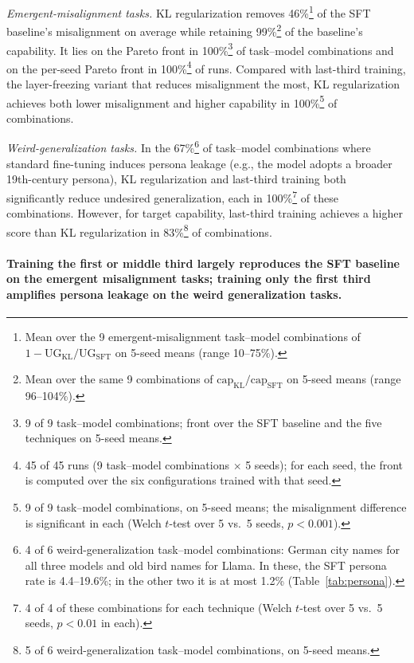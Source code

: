 \documentclass[11pt]{article}
\newenvironment{subpoints}%
  {\begin{list}{}{\setlength{\leftmargin}{1.5em}\setlength{\topsep}{4pt}%
   \setlength{\itemsep}{6pt}\setlength{\parsep}{0pt}\setlength{\labelwidth}{0pt}%
   \setlength{\labelsep}{0pt}}}%
  {\end{list}}
\begin{document}
\begin{subpoints}
\item \emph{Emergent-misalignment tasks.} KL regularization removes 46\%\footnote{Mean over the 9
emergent-misalignment task--model combinations of
$1 - \mathrm{UG}_{\mathrm{KL}}/\mathrm{UG}_{\mathrm{SFT}}$ on 5-seed means (range 10--75\%).} of
the SFT baseline's misalignment on average while retaining 99\%\footnote{Mean over the same 9
combinations of $\mathrm{cap}_{\mathrm{KL}}/\mathrm{cap}_{\mathrm{SFT}}$ on 5-seed means (range
96--104\%).} of the baseline's capability. It lies on the Pareto front in 100\%\footnote{9 of 9
task--model combinations; front over the SFT baseline and the five techniques on 5-seed means.}
of task--model combinations and on the per-seed Pareto front in 100\%\footnote{45 of 45 runs
(9 task--model combinations $\times$ 5 seeds); for each seed, the front is computed over the six
configurations trained with that seed.} of runs. Compared with last-third training, the
layer-freezing variant that reduces misalignment the most, KL regularization achieves both lower
misalignment and higher capability in 100\%\footnote{9 of 9 task--model combinations, on 5-seed
means; the misalignment difference is significant in each (Welch $t$-test over 5 vs.\ 5 seeds,
$p < 0.001$).} of combinations.

\item \emph{Weird-generalization tasks.} In the 67\%\footnote{4 of 6 weird-generalization task--model
combinations: German city names for all three models and old bird names for Llama. In these, the
SFT persona rate is 4.4--19.6\%; in the other two it is at most 1.2\% (Table~\ref{tab:persona}).}
of task--model combinations where standard fine-tuning induces persona leakage (e.g., the model
adopts a broader 19th-century persona), KL regularization and last-third training both
significantly reduce undesired generalization, each in 100\%\footnote{4 of 4 of these
combinations for each technique (Welch $t$-test over 5 vs.\ 5 seeds, $p < 0.01$ in each).} of
these combinations. However, for target capability, last-third training achieves a higher score
than KL regularization in 83\%\footnote{5 of 6 weird-generalization task--model combinations, on
5-seed means.} of combinations.
\end{subpoints}

\paragraph{Training the first or middle third largely reproduces the SFT baseline on the emergent
misalignment tasks; training only the first third amplifies persona leakage on the weird
generalization tasks.}\leavevmode
\end{document}
